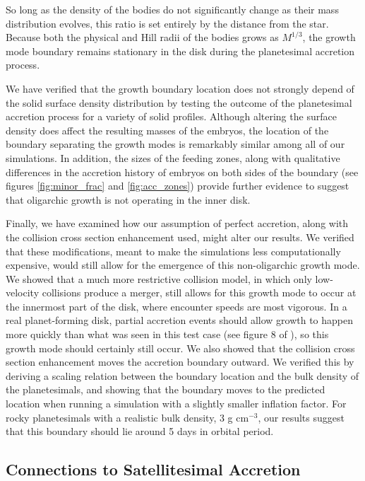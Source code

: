 \documentclass[twocolumn,linenumbers]{aastex63}
\begin{document}
So long as the density of the bodies do not significantly change as
their mass distribution evolves, this ratio is set entirely by the distance
from the star. Because both the physical and Hill radii of the bodies
grows as $M^{1/3}$, the growth mode boundary remains stationary
 in the disk during the planetesimal accretion process.
 
We have verified that the growth boundary location does not strongly depend of the
solid surface density distribution by testing the outcome of the planetesimal
accretion process for a variety of solid
profiles. Although altering the surface density does affect the
resulting masses of the embryos, the location of the boundary
separating the growth modes is remarkably similar among all of our simulations.
In addition, the sizes of the feeding zones, along with qualitative differences in the
accretion history of embryos on both sides of the boundary (see figures \ref{fig:minor_frac} and \ref{fig:acc_zones}) provide further evidence to
suggest that oligarchic growth is not operating in the inner disk.

Finally, we have examined how our assumption of perfect accretion, along with the collision cross section enhancement used, might alter our results. 
We verified that these modifications, meant to make the simulations less computationally expensive, would still allow for the emergence of this 
non-oligarchic growth mode.
We showed that a much more restrictive collision model, in which only low-velocity collisions produce a merger, still allows for 
this growth mode to occur at the innermost part of the disk, where encounter speeds are most vigorous. In a real planet-forming 
disk, partial accretion events should allow growth to happen more quickly than what was seen in this test case (see figure 8 of \citet{leinhardt15}), so this growth 
mode should certainly still occur. We also showed that the collision cross section enhancement moves the accretion boundary 
outward. We verified this by deriving a scaling relation between the boundary location and the bulk density of the planetesimals, 
and showing that the boundary moves to the predicted location when running a simulation with a slightly smaller inflation factor. 
For rocky planetesimals with a realistic bulk density, 3 g cm$^{-3}$, our results suggest that this boundary should lie around 5 days in orbital period.

\subsection{Connections to Satellitesimal Accretion}
\end{document}
